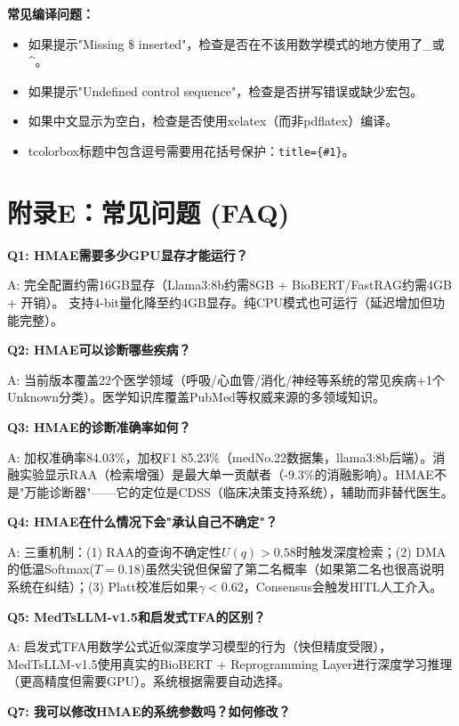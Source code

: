 \documentclass[11pt,a4paper]{ctexart}
\begin{document}
\textbf{常见编译问题：}
\begin{itemize}[nosep]
\item 如果提示"Missing \$ inserted"，检查是否在不该用数学模式的地方使用了\_或\^{}。
\item 如果提示"Undefined control sequence"，检查是否拼写错误或缺少宏包。
\item 如果中文显示为空白，检查是否使用xelatex（而非pdflatex）编译。
\item tcolorbox标题中包含逗号需要用花括号保护：\texttt{title=\{\#1\}}。
\end{itemize}



\section*{附录E：常见问题 (FAQ)}

\textbf{Q1: HMAE需要多少GPU显存才能运行？}

A: 完全配置约需16GB显存（Llama3:8b约需8GB + BioBERT/FastRAG约需4GB + 开销）。
支持4-bit量化降至约4GB显存。纯CPU模式也可运行（延迟增加但功能完整）。

\textbf{Q2: HMAE可以诊断哪些疾病？}

A: 当前版本覆盖22个医学领域（呼吸/心血管/消化/神经等系统的常见疾病+1个Unknown分类）。医学知识库覆盖PubMed等权威来源的多领域知识。

\textbf{Q3: HMAE的诊断准确率如何？}

A: 加权准确率84.03\%，加权F1 85.23\%（medNo.22数据集，llama3:8b后端）。消融实验显示RAA（检索增强）是最大单一贡献者（-9.3\%的消融影响）。HMAE不是"万能诊断器"——它的定位是CDSS（临床决策支持系统），辅助而非替代医生。

\textbf{Q4: HMAE在什么情况下会"承认自己不确定"？}

A: 三重机制：(1) RAA的查询不确定性$U(q) > 0.58$时触发深度检索；(2) DMA的低温Softmax($T=0.18$)虽然尖锐但保留了第二名概率（如果第二名也很高说明系统在纠结）；(3) Platt校准后如果$\gamma < 0.62$，Consensus会触发HITL人工介入。

\textbf{Q5: MedTsLLM-v1.5和启发式TFA的区别？}

A: 启发式TFA用数学公式近似深度学习模型的行为（快但精度受限），MedTsLLM-v1.5使用真实的BioBERT + Reprogramming Layer进行深度学习推理（更高精度但需要GPU）。系统根据需要自动选择。


\textbf{Q7: 我可以修改HMAE的系统参数吗？如何修改？}
\end{document}
